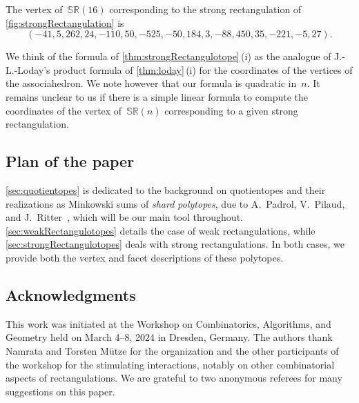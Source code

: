 \documentclass{amsart}
\theoremstyle{definition}
\newtheorem{example}[theorem]{Example}
\renewcommand{\b}[1]{{\boldsymbol{#1}}} %
\newcommand{\darkblue}{\color{darkblue}} %
\newcommand{\defn}[1]{\textsl{\darkblue #1}} %
\newcommand{\vincent}[1]{\todo[size=\normalsize, color=blue!30]{\rm #1 \\ \hfill --- V.}}
\newcommand{\polytope}[1]{\mathds{#1}} %
\newcommand{\SRP}{\polytope{SR}} %
\begin{document}
  The vertex of~$\SRP (16)$ corresponding to the strong rectangulation of \cref{fig:strongRectangulation} is
  \[
  (-41, 5, 262, 24, -110, 50, -525, -50, 184, 3, -88, 450, 35, -221, -5, 27).
  \]

\enlargethispage{.2cm}
We think of the formula of \cref{thm:strongRectangulotope}\,(i) as the analogue of J.-L.-Loday's product formula of \cref{thm:loday}\,(i) for the coordinates of the vertices of the associahedron.
We note however that our formula is quadratic in~$n$.
It remains unclear to us if there is a simple linear formula to compute the coordinates of the vertex of~$\SRP(n)$ corresponding to a given strong rectangulation.


\subsection{Plan of the paper}
\label{subsec:plan}

\cref{sec:quotientopes} is dedicated to the background on quotientopes and their realizations as Minkowski sums of \defn{shard polytopes}, due to A.~Padrol, V.~Pilaud, and J.~Ritter~\cite{MR4584712}, which will be our main tool throughout. \cref{sec:weakRectangulotopes} details the case of weak rectangulations, while \cref{sec:strongRectangulotopes} deals with strong rectangulations. In both cases, we provide both the vertex and facet descriptions of these polytopes.


\subsection{Acknowledgments}

This work was initiated at the Workshop on Combinatorics, Algorithms, and Geometry held on March 4--8, 2024 in Dresden, Germany.
The authors thank Namrata and Torsten M\"utze for the organization and the other participants of the workshop for the stimulating interactions, notably on other combinatorial aspects of rectangulations.
We are grateful to two anonymous referees for many suggestions on this paper.
\end{document}

